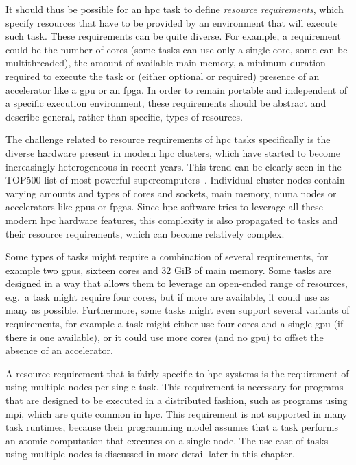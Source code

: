 It should thus be possible for an \gls{hpc} task to define
\emph{resource requirements}, which specify resources that have to be provided by an environment
that will execute such task. These requirements can be quite diverse. For example, a requirement
could be the number of cores (some tasks can use only a single core, some can be multithreaded),
the amount of available main memory, a minimum duration required to execute the task or (either
optional or required) presence of an accelerator like a \gls{gpu} or an
\gls{fpga}\@. In order to remain portable and independent of a specific execution
environment, these requirements should be abstract and describe general, rather than specific,
types of resources.

The challenge related to resource requirements of \gls{hpc} tasks specifically is
the diverse hardware present in modern \gls{hpc} clusters, which have started to
become increasingly heterogeneous in recent years. This trend can be clearly seen in the TOP500
list of most powerful supercomputers~\cite{top500analysis}. Individual cluster nodes contain
varying amounts and types of cores and sockets, main memory, \gls{numa} nodes or
accelerators like \glspl{gpu} or \glspl{fpga}. Since
\gls{hpc} software tries to leverage all these modern \gls{hpc}
hardware features, this complexity is also propagated to tasks and their resource requirements,
which can become relatively complex.

Some types of tasks might require a combination of several requirements, for example two
\glspl{gpu}, sixteen cores and 32 GiB of main memory. Some tasks are designed in a
way that allows them to leverage an open-ended range of resources, e.g.\ a task might require four
cores, but if more are available, it could use as many as possible. Furthermore, some tasks might
even support several variants of requirements, for example a task might either use four cores and a
single \gls{gpu} (if there is one available), or it could use more cores (and no \gls{gpu})
to offset the absence of an accelerator.

A resource requirement that is fairly specific to \gls{hpc} systems is the
requirement of using multiple nodes per single task. This requirement is necessary for programs
that are designed to be executed in a distributed fashion, such as programs using
\gls{mpi}, which are quite common in \gls{hpc}. This
requirement is not supported in many task runtimes, because their programming model assumes that a
task performs an atomic computation that executes on a single node. The use-case of tasks using
multiple nodes is discussed in more detail later in this chapter.

